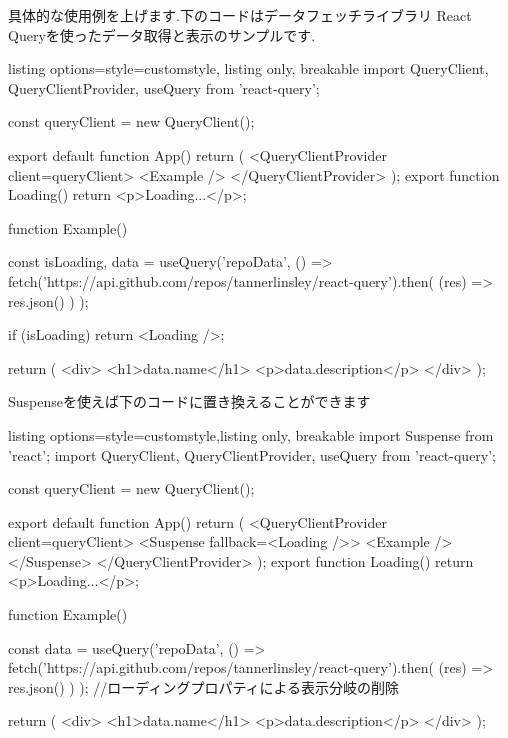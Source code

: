 具体的な使用例を上げます.下のコードはデータフェッチライブラリ React Queryを使ったデータ取得と表示のサンプルです.






\begin{tcblisting}{listing options={style=customstyle}, listing only, breakable}
  import { QueryClient, QueryClientProvider, useQuery } from 'react-query';

  const queryClient = new QueryClient();

  export default function App() {
  return (
  <QueryClientProvider client={queryClient}>
  <Example />
  </QueryClientProvider>
  );
  }
  export function Loading() {
      return <p>Loading...</p>;
    }

  function Example() {
      const { isLoading, data } = useQuery('repoData', () =>
      fetch('https://api.github.com/repos/tannerlinsley/react-query').then(
      (res) => res.json()
      )
      );

      if (isLoading) return <Loading />;

      return (
      <div>
        <h1>{data.name}</h1>
        <p>{data.description}</p>
      </div>
      );
    }
\end{tcblisting}




Suspenseを使えば下のコードに置き換えることができます


\begin{tcblisting}{listing options={style=customstyle},listing only, breakable}
  import { Suspense } from 'react';
  import { QueryClient, QueryClientProvider, useQuery } from 'react-query';

  const queryClient = new QueryClient();

  export default function App() {
  return (
  <QueryClientProvider client={queryClient}>
  <Suspense fallback={<Loading />}>
  <Example />
  </Suspense>
  </QueryClientProvider>
  );
  }
  export function Loading() {
      return <p>Loading...</p>;
    }

  function Example() {
      const { data } = useQuery('repoData', () =>
      fetch('https://api.github.com/repos/tannerlinsley/react-query').then(
      (res) => res.json()
      )
      );
      //ローディングプロパティによる表示分岐の削除

      return (
      <div>
        <h1>{data.name}</h1>
        <p>{data.description}</p>
      </div>
      );
    }
\end{tcblisting}





